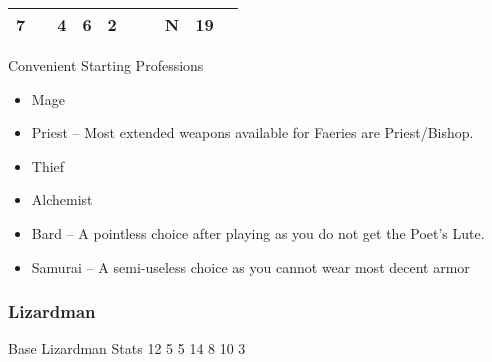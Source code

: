 \documentclass[12pt]{article}
\begin{document}
\begin{longtable}[]{@{}llllllllll@{}}
\begin{minipage}[t]{0.06\columnwidth}\raggedright\strut
7
\strut\end{minipage} &
\begin{minipage}[t]{0.06\columnwidth}\raggedright\strut
\strut\end{minipage} &
\begin{minipage}[t]{0.06\columnwidth}\raggedright\strut
4
\strut\end{minipage} &
\begin{minipage}[t]{0.06\columnwidth}\raggedright\strut
6
\strut\end{minipage} &
\begin{minipage}[t]{0.06\columnwidth}\raggedright\strut
2
\strut\end{minipage} &
\begin{minipage}[t]{0.06\columnwidth}\raggedright\strut
\strut\end{minipage} &
\begin{minipage}[t]{0.06\columnwidth}\raggedright\strut
\strut\end{minipage} &
\begin{minipage}[t]{0.07\columnwidth}\raggedright\strut
N
\strut\end{minipage} &
\begin{minipage}[t]{0.08\columnwidth}\raggedright\strut
19
\strut\end{minipage}\tabularnewline
\bottomrule
\end{longtable}

Convenient Starting Professions

\begin{itemize}
\item
  Mage
\item
  Priest -- Most extended weapons available for Faeries are
  Priest/Bishop.
\item
  Thief
\item
  Alchemist
\item
  Bard -- A pointless choice after playing as you do not get the Poet's
  Lute.
\item
  Samurai -- A semi-useless choice as you cannot wear most decent armor
\end{itemize}

\subsubsection{Lizardman}\label{lizardman}

Base Lizardman Stats 12 5 5 14 8 10 3
\end{document}
